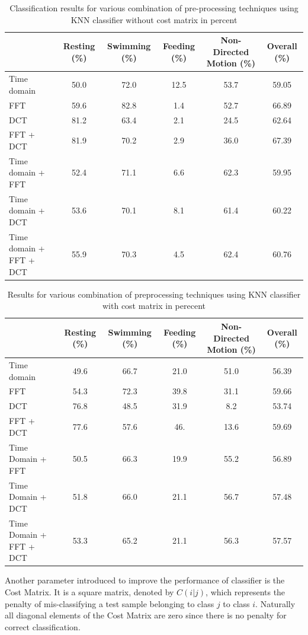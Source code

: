 \documentclass[conference]{IEEEtran}
\begin{document}
\begin{table}[h]
	\centering
	\caption{Classification results for various combination of pre-processing techniques using KNN classifier without cost matrix in percent}
	\begin{tabular}{l c c c c c}
	\hline
	& \textbf{Resting} (\%) & \textbf{Swimming}  (\%) & \textbf{Feeding}  (\%) & \textbf{Non-Directed Motion}  (\%) & \textbf{Overall}  (\%) \\
	\hline
	Time domain & 50.0&	72.0&	12.5&	53.7&	59.05\\
     FFT & 59.6&	82.8&	1.4&	52.7&	66.89\\
     DCT & 81.2&	63.4&	2.1&	24.5&	62.64 \\
   FFT + DCT & 81.9&	70.2&	2.9&	36.0& 	67.39\\
	Time domain + FFT & 52.4& 	71.1&	6.6&	62.3&	59.95 \\
	Time domain + DCT & 53.6& 	70.1&	8.1&	61.4&	60.22\\
	Time domain + FFT + DCT & 55.9&	70.3&	4.5&	62.4&	60.76 \\
	\hline
	\end{tabular}
	\label{without cost matrix}
\end{table}

\begin{table}[h]
	\centering
	\caption{Results for various combination of preprocessing techniques using KNN classifier with cost matrix in perecent}
	\begin{tabular}{l c c c c c}
	\hline
	& \textbf{Resting} (\%) & \textbf{Swimming}  (\%) & \textbf{Feeding}  (\%) & \textbf{Non-Directed Motion}  (\%) & \textbf{Overall}  (\%) \\
	\hline
	Time domain & 49.6	&66.7&	21.0&	51.0&	56.39\\
     FFT & 54.3&	72.3&	39.8&	31.1&	59.66\\
     DCT & 76.8&	48.5&	31.9&	8.2&	53.74\\
   FFT + DCT & 77.6&	57.6&	46.&	13.6&	59.69\\
	Time Domain + FFT & 50.5&	66.3&	19.9&	55.2&	56.89\\
	Time Domain + DCT & 51.8&	66.0&	21.1&	56.7&	57.48\\
	Time Domain + FFT + DCT & 53.3&	65.2&	21.1&	56.3&	57.57\\
	\hline
	\end{tabular}
	\label{without cost matrix}
\end{table}

Another parameter introduced to improve the performance of classifier is the Cost Matrix\cite{math}. It is a square matrix, denoted by $C(i|j)$, which represents the penalty of mis-classifying a test sample belonging to class $j$ to class $i$.  Naturally all diagonal elements of the Cost Matrix are zero since there is no penalty for correct classification. 
\end{document}

